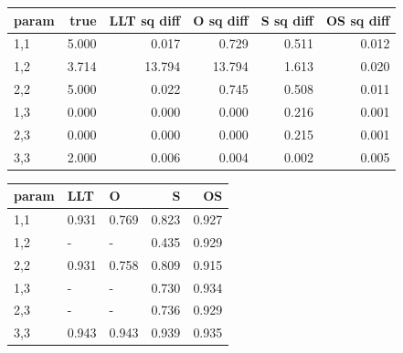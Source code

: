 \documentclass[
]{article}
\begin{document}
\begin{longtable}[t]{l|r|r|r|r|r}
\hline
param & true & LLT sq diff & O sq diff & S sq diff & OS sq diff\\
\hline
1,1 & 5.000 & 0.017 & 0.729 & 0.511 & 0.012\\
\hline
1,2 & 3.714 & 13.794 & 13.794 & 1.613 & 0.020\\
\hline
2,2 & 5.000 & 0.022 & 0.745 & 0.508 & 0.011\\
\hline
1,3 & 0.000 & 0.000 & 0.000 & 0.216 & 0.001\\
\hline
2,3 & 0.000 & 0.000 & 0.000 & 0.215 & 0.001\\
\hline
3,3 & 2.000 & 0.006 & 0.004 & 0.002 & 0.005\\
\hline
\end{longtable}

\begin{longtable}[t]{l|l|l|r|r}
\hline
param & LLT & O & S & OS\\
\hline
1,1 & 0.931 & 0.769 & 0.823 & 0.927\\
\hline
1,2 & - & - & 0.435 & 0.929\\
\hline
2,2 & 0.931 & 0.758 & 0.809 & 0.915\\
\hline
1,3 & - & - & 0.730 & 0.934\\
\hline
2,3 & - & - & 0.736 & 0.929\\
\hline
3,3 & 0.943 & 0.943 & 0.939 & 0.935\\
\hline
\end{longtable}
\end{document}
